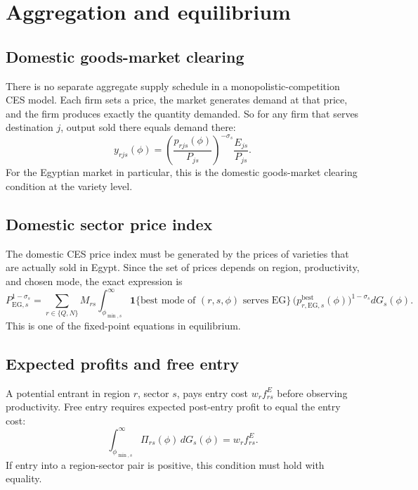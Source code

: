 \documentclass[11pt]{article}
\begin{document}
\section{Aggregation and equilibrium}

\subsection{Domestic goods-market clearing}

There is no separate aggregate supply schedule in a monopolistic-competition CES model. Each firm sets a price, the market generates demand at that price, and the firm produces exactly the quantity demanded. So for any firm that serves destination \(j\), output sold there equals demand there:
\begin{equation}
y_{rjs}(\phi)=\left(\frac{p_{rjs}(\phi)}{P_{js}}\right)^{-\sigma_s}\frac{E_{js}}{P_{js}}.
\end{equation}
For the Egyptian market in particular, this is the domestic goods-market clearing condition at the variety level.

\subsection{Domestic sector price index}

The domestic CES price index must be generated by the prices of varieties that are actually sold in Egypt. Since the set of prices depends on region, productivity, and chosen mode, the exact expression is
\begin{equation}
P_{\mathrm{EG},s}^{1-\sigma_s}=\sum_{r\in\{Q,N\}}M_{rs}\int_{\phi_{\min,s}}^{\infty}\mathbf{1}\{\text{best mode of }(r,s,\phi)\text{ serves EG}\}\,\Big(p_{r,\mathrm{EG},s}^{\mathrm{best}}(\phi)\Big)^{1-\sigma_s}dG_s(\phi).
\label{eq:peg_consistency_final}
\end{equation}
This is one of the fixed-point equations in equilibrium.

\subsection{Expected profits and free entry}

A potential entrant in region \(r\), sector \(s\), pays entry cost \(w_rf^E_{rs}\) before observing productivity. Free entry requires expected post-entry profit to equal the entry cost:
\begin{equation}
\int_{\phi_{\min,s}}^{\infty}\Pi_{rs}(\phi)\,dG_s(\phi)=w_rf^E_{rs}.
\label{eq:freeentry_final}
\end{equation}
If entry into a region-sector pair is positive, this condition must hold with equality.
\end{document}

